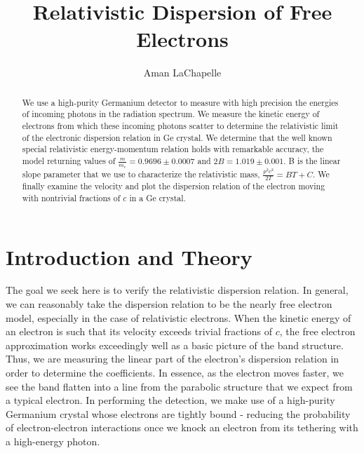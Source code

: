 \documentclass[reprint, nobibnotes, amssymb, amsmath, amsfonts, physics, mathtools, mathrsfs, floatfix]{revtex4-1}
\begin{document}
  \title{Relativistic Dispersion of Free Electrons}

  \author{Aman LaChapelle}


  \begin{abstract}
    We use a high-purity Germanium detector to measure with high precision the energies of incoming photons in the radiation spectrum.  We measure the kinetic energy of electrons from which these incoming photons scatter to determine the relativistic limit of the electronic dispersion relation in Ge crystal.  We determine that the well known special relativistic energy-momentum relation holds with remarkable accuracy, the model returning values of $\frac{m}{m_e} = 0.9696 \pm 0.0007$ and $2B = 1.019 \pm 0.001$.  B is the linear slope parameter that we use to characterize the relativistic mass, $\frac{p^2c^2}{2T} = BT + C$.  We finally examine the velocity and plot the dispersion relation of the electron moving with nontrivial fractions of $c$ in a Ge crystal.
  \end{abstract}

  \maketitle
  \newpage

  \section{Introduction and Theory}
    The goal we seek here is to verify the relativistic dispersion relation.  In general, we can reasonably take the dispersion relation to be the nearly free electron model, especially in the case of relativistic electrons.  When the kinetic energy of an electron is such that its velocity exceeds trivial fractions of $c$, the free electron approximation works exceedingly well as a basic picture of the band structure.  Thus, we are measuring the linear part of the electron's dispersion relation in order to determine the coefficients.  In essence, as the electron moves faster, we see the band flatten into a line from the parabolic structure that we expect from a typical electron.  In performing the detection, we make use of a high-purity Germanium crystal whose electrons are tightly bound - reducing the probability of electron-electron interactions once we knock an electron from its tethering with a high-energy photon.

    \hspace{.25cm}
\end{document}
